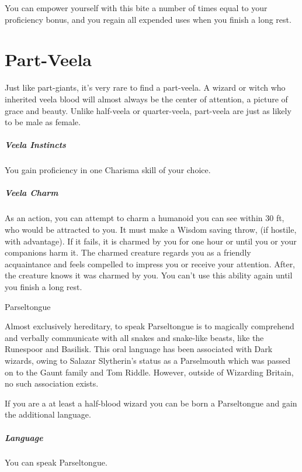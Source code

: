 \documentclass[a4paper,twocolumn,openany,nodeprecatedcode]{dndbook}
\begin{document}
        You can empower yourself with this bite a number of times equal to your proficiency bonus, and you regain all expended uses when you finish a long rest.


    \section{Part-Veela}

        Just like part-giants, it's very rare to find a part-veela. A wizard or witch who inherited veela blood will almost always be the center of attention, a picture of grace and beauty. Unlike half-veela or quarter-veela, part-veela are just as likely to be male as female.

        \subparagraph{Veela Instincts} You gain proficiency in one Charisma skill of your choice.
        \subparagraph{Veela Charm} As an action, you can attempt to charm a humanoid you can see within 30 ft, who would be attracted to you. It must make a Wisdom saving throw, (if hostile, with advantage). If it fails, it is charmed by you for one hour or until you or your companions harm it. The charmed creature regards you as a friendly acquaintance and feels compelled to impress you or receive your attention. After, the creature knows it was charmed by you. You can't use this ability again until you finish a long rest.


    \begin{DndSidebar}{Parseltongue}

        Almost exclusively hereditary, to speak Parseltongue is to magically comprehend and verbally communicate with all snakes and snake-like beasts, like the Runespoor and Basilisk. This oral language has been associated with Dark wizards, owing to Salazar Slytherin's status as a Parselmouth which was passed on to the Gaunt family and Tom Riddle. However, outside of Wizarding Britain, no such association exists.

        If you are a at least a half-blood wizard you can be born a Parseltongue and gain the additional language.

        \subparagraph{Language} You can speak Parseltongue.
    \end{DndSidebar}
\end{document}
